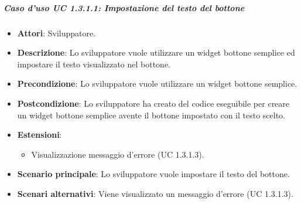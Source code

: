 \subparagraph{Caso d'uso UC 1.3.1.1: Impostazione del testo del bottone}
\FloatBarrier
\begin{itemize}
\item\textbf{Attori}: Sviluppatore.
\item\textbf{Descrizione}: Lo sviluppatore vuole utilizzare un widget bottone semplice ed impostare il testo visualizzato nel bottone.
\item\textbf{Precondizione}: Lo sviluppatore vuole utilizzare un widget bottone semplice.
\item\textbf{Postcondizione}: Lo sviluppatore ha creato del codice eseguibile per creare un widget bottone semplice avente il bottone impostato con il testo scelto.
\item \textbf{Estensioni}: 
\begin{itemize}
\item Visualizzazione messaggio d'errore (UC 1.3.1.3).
\end{itemize}
\item \textbf{Scenario principale}: Lo sviluppatore vuole impostare il testo del bottone.
\item \textbf{Scenari alternativi}: Viene visualizzato un messaggio d'errore (UC 1.3.1.3).
\end{itemize}
